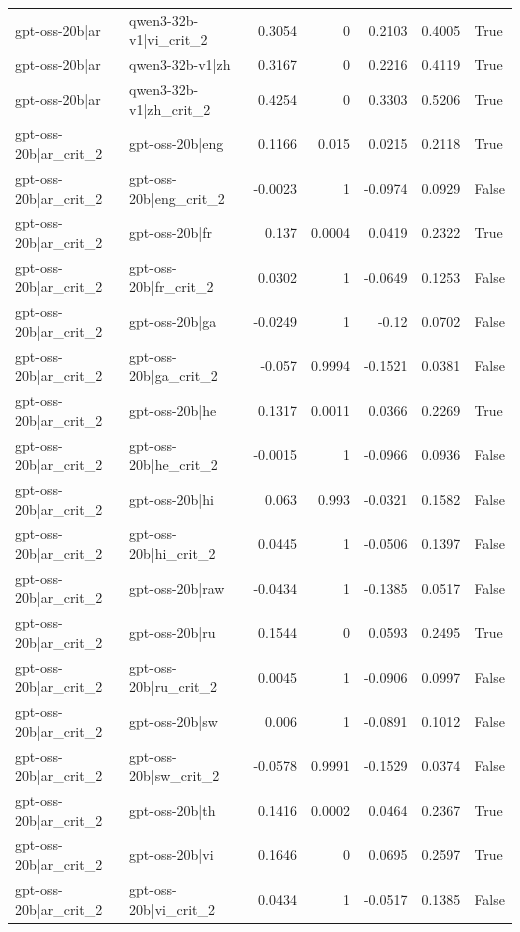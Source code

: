 \begin{table}
\begin{tabular}{l l r r r r l}
gpt-oss-20b|ar & qwen3-32b-v1|vi_crit_2 & 0.3054 & 0 & 0.2103 & 0.4005 & True \\
gpt-oss-20b|ar & qwen3-32b-v1|zh & 0.3167 & 0 & 0.2216 & 0.4119 & True \\
gpt-oss-20b|ar & qwen3-32b-v1|zh_crit_2 & 0.4254 & 0 & 0.3303 & 0.5206 & True \\
gpt-oss-20b|ar_crit_2 & gpt-oss-20b|eng & 0.1166 & 0.015 & 0.0215 & 0.2118 & True \\
gpt-oss-20b|ar_crit_2 & gpt-oss-20b|eng_crit_2 & -0.0023 & 1 & -0.0974 & 0.0929 & False \\
gpt-oss-20b|ar_crit_2 & gpt-oss-20b|fr & 0.137 & 0.0004 & 0.0419 & 0.2322 & True \\
gpt-oss-20b|ar_crit_2 & gpt-oss-20b|fr_crit_2 & 0.0302 & 1 & -0.0649 & 0.1253 & False \\
gpt-oss-20b|ar_crit_2 & gpt-oss-20b|ga & -0.0249 & 1 & -0.12 & 0.0702 & False \\
gpt-oss-20b|ar_crit_2 & gpt-oss-20b|ga_crit_2 & -0.057 & 0.9994 & -0.1521 & 0.0381 & False \\
gpt-oss-20b|ar_crit_2 & gpt-oss-20b|he & 0.1317 & 0.0011 & 0.0366 & 0.2269 & True \\
gpt-oss-20b|ar_crit_2 & gpt-oss-20b|he_crit_2 & -0.0015 & 1 & -0.0966 & 0.0936 & False \\
gpt-oss-20b|ar_crit_2 & gpt-oss-20b|hi & 0.063 & 0.993 & -0.0321 & 0.1582 & False \\
gpt-oss-20b|ar_crit_2 & gpt-oss-20b|hi_crit_2 & 0.0445 & 1 & -0.0506 & 0.1397 & False \\
gpt-oss-20b|ar_crit_2 & gpt-oss-20b|raw & -0.0434 & 1 & -0.1385 & 0.0517 & False \\
gpt-oss-20b|ar_crit_2 & gpt-oss-20b|ru & 0.1544 & 0 & 0.0593 & 0.2495 & True \\
gpt-oss-20b|ar_crit_2 & gpt-oss-20b|ru_crit_2 & 0.0045 & 1 & -0.0906 & 0.0997 & False \\
gpt-oss-20b|ar_crit_2 & gpt-oss-20b|sw & 0.006 & 1 & -0.0891 & 0.1012 & False \\
gpt-oss-20b|ar_crit_2 & gpt-oss-20b|sw_crit_2 & -0.0578 & 0.9991 & -0.1529 & 0.0374 & False \\
gpt-oss-20b|ar_crit_2 & gpt-oss-20b|th & 0.1416 & 0.0002 & 0.0464 & 0.2367 & True \\
gpt-oss-20b|ar_crit_2 & gpt-oss-20b|vi & 0.1646 & 0 & 0.0695 & 0.2597 & True \\
gpt-oss-20b|ar_crit_2 & gpt-oss-20b|vi_crit_2 & 0.0434 & 1 & -0.0517 & 0.1385 & False \\

\end{tabular}
\end{table}
